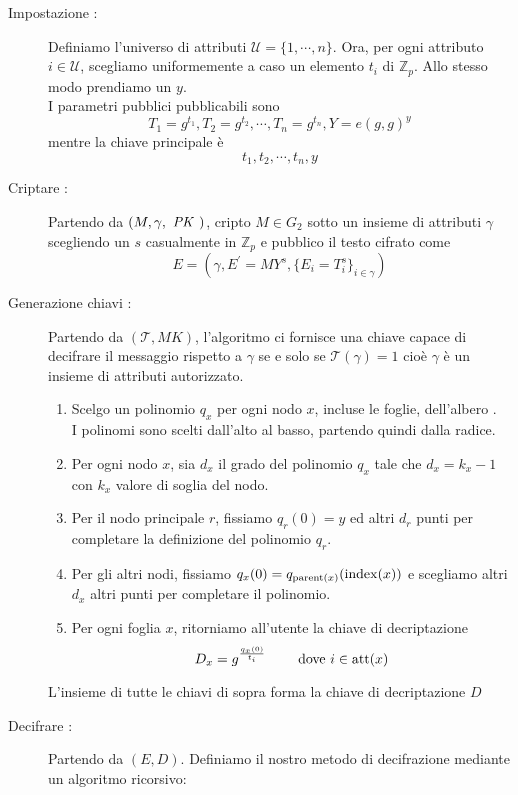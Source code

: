 \begin{description}
\item[Impostazione :]Definiamo l'universo di attributi $\mathcal{U} = \{1,\cdots,n\}$. Ora, per ogni attributo $i \in \mathcal{U}$, scegliamo uniformemente a caso un elemento $t_i$ di $\mathbb{Z}_p$. Allo stesso modo prendiamo un $y$.\\
I parametri pubblici \pk pubblicabili sono
\[ T_1 = g^{t_1} , T_2 = g^{t_2} , \cdots , T_n = g^{t_n} , Y = e(g,g)^y \]\label{pubchiavi}
mentre la chiave principale \mk è
\[ t_1 , t_2 , \cdots , t_n , y \]
\vspace{0.1cm}
\item[Criptare :] Partendo da $(M , \gamma, \text{ \textit{PK} })$, cripto $M \in G_2$ sotto un insieme di attributi $\gamma$ scegliendo un $s$ casualmente in $\mathbb{Z}_p$ e pubblico il testo cifrato come
\[ E = (\gamma , E^\prime = MY^s , \{E_i = T_i^s \}_{i\in\gamma}) \]
\vspace{0.1cm}
\item[Generazione chiavi :] Partendo da $( \mathcal{T} , MK )$, l'algoritmo ci fornisce una chiave capace di decifrare il messaggio rispetto a $\gamma$ se e solo se $\mathcal{T}(\gamma) = 1$ cioè $\gamma$ è un insieme di attributi autorizzato.
\begin{enumerate}
\item Scelgo un polinomio $q_x$ per ogni nodo $x$, incluse le foglie, dell'albero .\\
I polinomi sono scelti dall'alto al basso, partendo quindi dalla radice.
\item Per ogni nodo $x$, sia $d_x$ il grado del polinomio $q_x$ tale che $d_x = k_x - 1$ con $k_x$ valore di soglia del nodo.
\item Per il nodo principale $r$, fissiamo $q_r(0) = y$ ed altri $d_r$ punti per completare la definizione del polinomio $q_r$.
\item Per gli altri nodi, fissiamo $q_x(0) = q_{\operatorname{parent}(x)}(\operatorname{index}(x))$ e scegliamo altri $d_x$ altri punti per completare il polinomio.
\item Per ogni foglia $x$, ritorniamo all'utente la chiave di decriptazione
\[ D_x = g^{\frac{q_x(0)}{t_i}} \qquad \text{ dove } i \in \operatorname{att}(x) \]
\end{enumerate}
L'insieme di tutte le chiavi di sopra forma la chiave di decriptazione $D$
\vspace{0.1cm}
\item[Decifrare :] Partendo da $(E,D)$. Definiamo il nostro metodo di decifrazione mediante un algoritmo ricorsivo:\\

\end{description}

